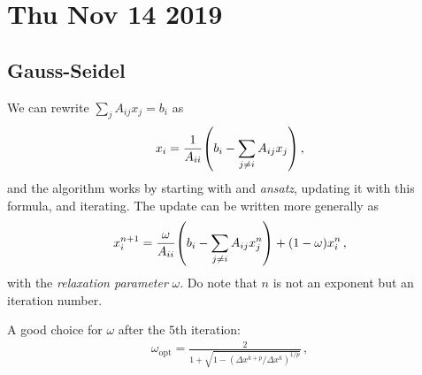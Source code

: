 \documentclass[main.tex]{subfiles}
\begin{document}
\section*{Thu Nov 14 2019}

\subsection{Gauss-Seidel}

We can rewrite \(\sum _{j} A_{ij} x_{j} = b_i\) as 
%
\begin{align}
  x_{i} = \frac{1}{A_{ii}} \qty(b_{i} - \sum _{j \neq i} A_{ij}x_{j}) 
\,,
\end{align}
%
and the algorithm works by starting with and \emph{ansatz}, updating it with this formula, and iterating.
The update can be written more generally as 
%
\begin{align}
    x_{i}^{n+1} = \frac{\omega }{A_{ii}} \qty(b_{i} - \sum _{j \neq i} A_{ij}x_{j}^{n}) + (1-\omega) x_{i}^{n} 
  \,,
  \end{align}
%
with the \emph{relaxation parameter} \(\omega \).
Do note that \(n\) is not an exponent but an iteration number.

A good choice for \(\omega \) after the \(5\)th iteration: 
%
\begin{align}
  \omega _{\text{opt}} = \frac{2}{1 + \sqrt{1- (\Delta x^{k+p} / \Delta x^{k})^{1/p}}}
\,,
\end{align}
%
\end{document}

